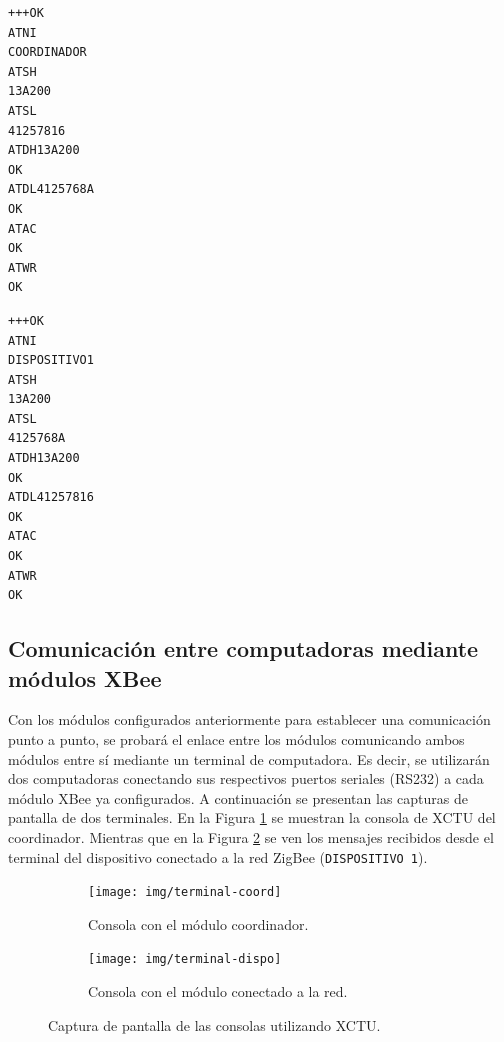 \documentclass[11pt,oneside,spanish,a4paper]{article}
\begin{document}
\noindent\begin{minipage}{.45\textwidth}
\begin{lstlisting}[emph={+++,ATWR,ATAC,ATNI,ATSH,ATSL,ATDH13A200,ATDL4125768A},
emphstyle={\color{blue}}, caption={Destino del coordinador.},label=code:coord-dest]
+++OK
ATNI
COORDINADOR
ATSH
13A200
ATSL
41257816
ATDH13A200
OK
ATDL4125768A
OK
ATAC
OK
ATWR
OK
\end{lstlisting}  
\end{minipage}\hfill
\begin{minipage}{.45\textwidth}
\begin{lstlisting}[emph={+++,ATWR,ATAC,ATSH,ATNI,ATSL,ATDH13A200,ATDL41257816},
emphstyle={\color{blue}}, caption={Destino del coordinador.},label=code:end-dest]
+++OK
ATNI
DISPOSITIVO1
ATSH
13A200
ATSL
4125768A
ATDH13A200
OK
ATDL41257816
OK
ATAC
OK
ATWR
OK
\end{lstlisting}  
\end{minipage}

\subsection[Enlace a través de Xbee]{Comunicación entre computadoras mediante módulos XBee}

Con los módulos configurados anteriormente para establecer una
comunicación punto a punto, se probará el enlace entre los módulos
comunicando ambos módulos entre sí mediante un terminal de
computadora. Es decir, se utilizarán dos computadoras conectando sus
respectivos puertos seriales (RS232) a cada módulo XBee ya
configurados. A continuación se presentan las capturas de pantalla de
dos terminales. En la Figura \ref{fig:term-coord} se muestran la
consola de XCTU del coordinador. Mientras que en la Figura
\ref{fig:term-end} se ven los mensajes recibidos desde el terminal del
dispositivo conectado a la red ZigBee (\texttt{DISPOSITIVO 1}).

\begin{figure}[h]
  \centering
  \begin{subfigure}{0.8\textwidth}
    \centering
    \texttt{[image: img/terminal-coord]}
    \caption{Consola con el módulo coordinador.}
    \label{fig:term-coord}
  \end{subfigure}
  \begin{subfigure}{0.8\textwidth}
    \centering
    \texttt{[image: img/terminal-dispo]}
    \caption{Consola con el módulo conectado a la red.}
    \label{fig:term-end}
  \end{subfigure}
  \caption{Captura de pantalla de las consolas utilizando XCTU.}
  \label{fig:terminales}
\end{figure}
\end{document}
